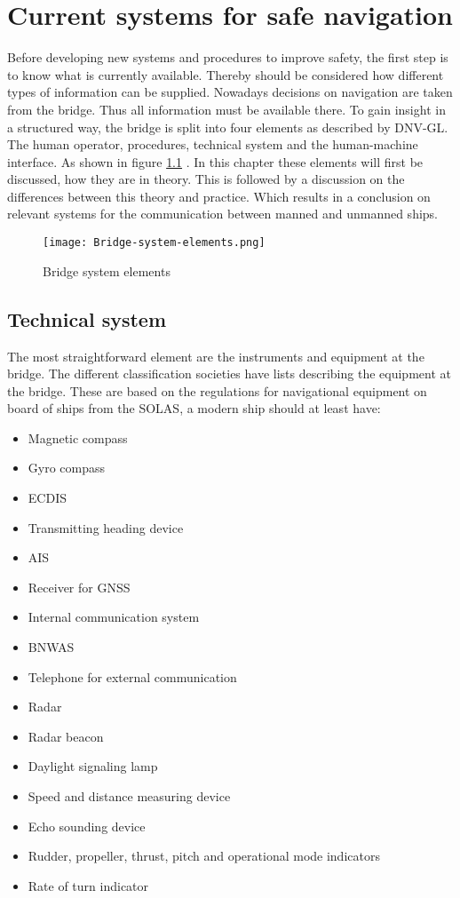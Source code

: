 \chapter{Current systems for safe navigation}
\label{ch:systems}
Before developing new systems and procedures to improve safety, the first step is to know what is currently available. Thereby should be considered how different types of information can be supplied. Nowadays decisions on navigation are taken from the bridge. Thus all information must be available there. To gain insight in a structured way, the bridge is split into four elements as described by DNV-GL. The human operator, procedures, technical system and the human-machine interface. As shown in figure \ref{fig:Bridge-system-elements} \cite{DNVGL2011}. In this chapter these elements will first be discussed, how they are in theory. This is followed by a discussion on the differences between this theory and practice. Which results in a conclusion on relevant systems for the communication between manned and unmanned ships.

\begin{figure}[H]
	\centering
	\texttt{[image: Bridge-system-elements.png]}
	\caption{Bridge system elements}
	\label{fig:Bridge-system-elements}
\end{figure}

\section{Technical system}
The most straightforward element are the instruments and equipment at the bridge. The different classification societies have lists describing the equipment at the bridge. These are based on the regulations for navigational equipment on board of ships from the \ac{SOLAS}, a modern ship should at least have:
\begin{multicols}{2}
	\begin{itemize}
		\item Magnetic compass
		\item Gyro compass
		\item \ac{ECDIS}
		\item Transmitting heading device
		\item \acf{AIS}
		\item Receiver for \ac{GNSS}
		\item Internal communication system
		\item \ac{BNWAS}
		\item Telephone for external communication
		\item Radar
		\item Radar beacon
		\item Daylight signaling lamp
		\item Speed and distance measuring device
		\item Echo sounding device
		\item Rudder, propeller, thrust, pitch and operational mode indicators
		\item Rate of turn indicator
	\end{itemize}
\end{multicols}

